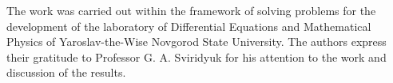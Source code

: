\documentclass[12pt]{llncs}
\begin{document}
The work was carried out within the framework of solving problems for the development of the laboratory of Differential Equations and Mathematical Physics of Yaroslav-the-Wise Novgorod State University. The authors express their gratitude to Professor G. A. Sviridyuk for his attention to the work and discussion of the results.



\end{document}
